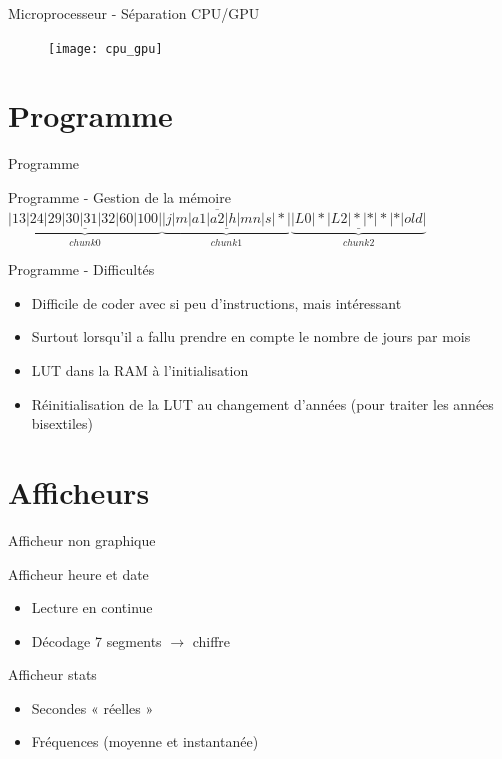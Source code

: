 \documentclass{beamer}
\begin{document}
\begin{frame}{Microprocesseur - Séparation CPU/GPU}
	\begin{figure}
		\centering
		\texttt{[image: cpu\_gpu]}
	\end{figure}
\end{frame}



\section{Programme}
\begin{frame}{Programme}
	
\end{frame}

\begin{frame}{Programme - Gestion de la mémoire}
	$\overline{\underbrace{\underline{|13|24|29|30|31|32|60|100|}}_{chunk 0}\underbrace{\underline{|j|m|a1|a2|h|mn|s|*|}}_{chunk 1}\underbrace{\underline{|L0|*|L2|*|*|*|*|old|}}_{chunk 2}}$
\end{frame}

\begin{frame}{Programme - Difficultés}
	\begin{itemize}
		\item Difficile de coder avec si peu d'instructions, mais intéressant
		\item Surtout lorsqu'il a fallu prendre en compte le nombre de jours par mois
		\item LUT dans la RAM à l'initialisation
		\item Réinitialisation de la LUT au changement d'années (pour traiter les années bisextiles)
	\end{itemize}
\end{frame}


\section{Afficheurs}
\begin{frame}{Afficheur non graphique}
	\begin{block}{Afficheur heure et date}
		\begin{itemize}
			\item Lecture en continue
			\item Décodage 7 segments $\rightarrow$ chiffre
		\end{itemize}
	\end{block}
	
	\pause
	
	\begin{block}{Afficheur stats}
		\begin{itemize}
			\item Secondes « réelles »
			\item Fréquences (moyenne et instantanée)
		\end{itemize}
	\end{block}
\end{frame}
\end{document}
